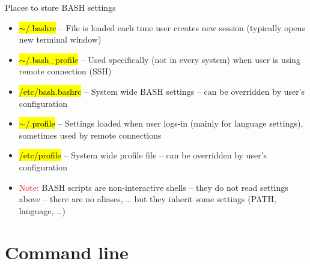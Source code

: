 \documentclass[compress, ucs, xelatex, 11pt, xcolor=svgnames,
  hyperref={
    bookmarks=true,
    unicode=true,
    colorlinks=true,
    pdftitle={Linux, command line and MetaCentrum},
    plainpages=false,
    pdfauthor={Vojtech Zeisek},
    pdfsubject={Course about use of Linux command line, writing shell scripts and using MetaCentrum of CESNET},
    pdfcreator={XeLaTeX},
    pdfkeywords={Linux, GNU, BASH, shell, command line, MetaCentrum},
    linkcolor=Red,
    anchorcolor=Blue,
    citecolor=Purple,
    filecolor=DodgerBlue,
    menucolor=DarkOrchid,
    urlcolor=DeepSkyBlue,
    pdftex},
  url={hyphens, lowtilde} %
  ]{beamer}
\renewcommand{\texttt}[1]{\hl{\ttfamily #1}}
\renewcommand{\alert}[1]{\textcolor{red}{#1}}
\begin{document}
\begin{frame}{Places to store BASH settings}
  \begin{itemize}
    \item \texttt{$\sim$/.bashrc} -- File is loaded each time user creates new session (typically opens new terminal window)
    \item \texttt{$\sim$/.bash\_profile} -- Used specifically (not in every system) when user is using remote connection (SSH)
    \item \texttt{/etc/bash.bashrc} -- System wide BASH settings -- can be overridden by user's configuration
    \item \texttt{$\sim$/.profile} -- Settings loaded when user logs-in (mainly for language settings), sometimes used by remote connections
    \item \texttt{/etc/profile} -- System wide profile file -- can be overridden by user's configuration
    \item \alert{Note:} BASH scripts are non-interactive shells -- they do not read settings above -- there are no aliases, \ldots{ }but they inherit some settings (PATH, language, \ldots)
  \end{itemize}
\end{frame}

\section{Command line}
\end{document}
